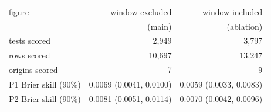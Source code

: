\begin{tabular}{lrr}
\toprule
figure & window excluded & window included \\
 & (main) & (ablation) \\
\midrule
tests scored & 2,949 & 3,797 \\
rows scored & 10,697 & 13,247 \\
origins scored & 7 & 9 \\
\midrule
P1 Brier skill (90\%) & 0.0069 (0.0041, 0.0100) & 0.0059 (0.0033, 0.0083) \\
P2 Brier skill (90\%) & 0.0081 (0.0051, 0.0114) & 0.0070 (0.0042, 0.0096) \\

\end{tabular}
